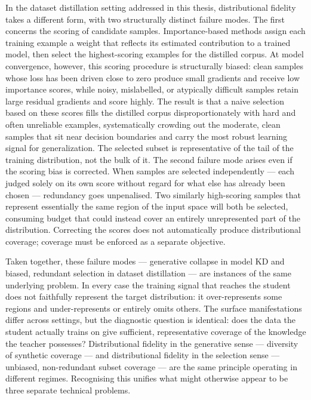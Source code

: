 \begin{foldable}
  In the dataset distillation setting addressed in this thesis, distributional fidelity takes a different form, with two structurally distinct failure modes.
  The first concerns the scoring of candidate samples.
  Importance-based methods assign each training example a weight that reflects its estimated contribution to a trained model, then select the highest-scoring examples for the distilled corpus.
  At model convergence, however, this scoring procedure is structurally biased: clean samples whose loss has been driven close to zero produce small gradients and receive low importance scores, while noisy, mislabelled, or atypically difficult samples retain large residual gradients and score highly.
  The result is that a naive selection based on these scores fills the distilled corpus disproportionately with hard and often unreliable examples, systematically crowding out the moderate, clean samples that sit near decision boundaries and carry the most robust learning signal for generalization.
  The selected subset is representative of the tail of the training distribution, not the bulk of it.
  The second failure mode arises even if the scoring bias is corrected.
  When samples are selected independently — each judged solely on its own score without regard for what else has already been chosen — redundancy goes unpenalised.
  Two similarly high-scoring samples that represent essentially the same region of the input space will both be selected, consuming budget that could instead cover an entirely unrepresented part of the distribution.
  Correcting the scores does not automatically produce distributional coverage; coverage must be enforced as a separate objective.
\end{foldable}

\begin{foldable}
  Taken together, these failure modes — generative collapse in model \ac{KD} and biased, redundant selection in dataset distillation — are instances of the same underlying problem.
  In every case the training signal that reaches the student does not faithfully represent the target distribution: it over-represents some regions and under-represents or entirely omits others.
  The surface manifestations differ across settings, but the diagnostic question is identical: does the data the student actually trains on give sufficient, representative coverage of the knowledge the teacher possesses?
  Distributional fidelity in the generative sense — diversity of synthetic coverage — and distributional fidelity in the selection sense — unbiased, non-redundant subset coverage — are the same principle operating in different regimes.
  Recognising this unifies what might otherwise appear to be three separate technical problems.
\end{foldable}

